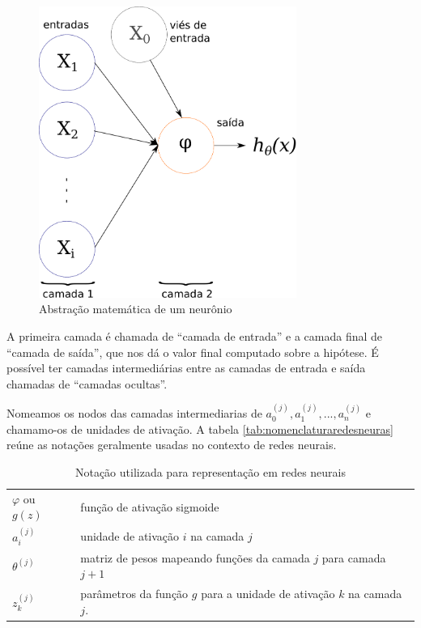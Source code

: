 \begin{figure}
\centering
\caption{Abstração matemática de um neurônio} \label{fig:neuroniomat}
\includegraphics[width=0.75\textwidth]{img/redeneuralmat.pdf}
\end{figure}


A primeira camada é chamada de ``camada de entrada'' e a camada final de ``camada de saída'', que nos dá o valor final computado sobre a hipótese. É possível ter camadas intermediárias entre as camadas de entrada e saída chamadas de ``camadas ocultas''. 

Nomeamos os nodos das camadas intermediarias de $a_0^{(j)}, a_1^{(j)}, ..., a_n^{(j)}$ e chamamo-os de unidades de ativação. A tabela \autoref{tab:nomenclaturaredesneuras} reúne as notações geralmente usadas no contexto de redes neurais.

\begin{table}[!htb]
\caption{Notação utilizada para representação em redes neurais} \label{tab:nomenclaturaredesneuras}
\begin{center}
\begin{tabular}{m{2cm}m{12.0cm}}
  \toprule
  $\varphi$ ou $g(z)$ & função de ativação sigmoide\\
  $a_i^{(j)}$ 	   & unidade de ativação $i$ na camada $j$ \\
  $\theta^{(j)}$   & matriz de pesos mapeando funções da camada $j$ para camada $j+1$  \\
  $z_k^{(j)}$	&	parâmetros da função $g$ para a unidade de ativação $k$ na camada $j$. \\
  \bottomrule
\end{tabular}
\end{center}

\end{table}


